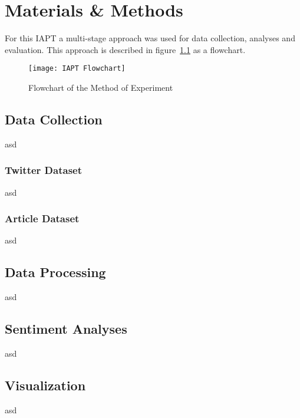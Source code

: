 \chapter{Materials \& Methods}


For this \ac{IAPT} a multi-stage approach was used for data collection, analyses and evaluation.
This approach is described in figure~\ref{fig:flowchart} as a flowchart.

\begin{figure}[h!]
\texttt{[image: IAPT Flowchart]}
\caption[Method Flowchart]{Flowchart of the Method of Experiment}
\label{fig:flowchart}
\end{figure}

\section{Data Collection}
asd
\subsection{Twitter Dataset}
asd
\subsection{Article Dataset}
asd

\section{Data Processing}
asd

\section{Sentiment Analyses}
asd

\section{Visualization}
asd